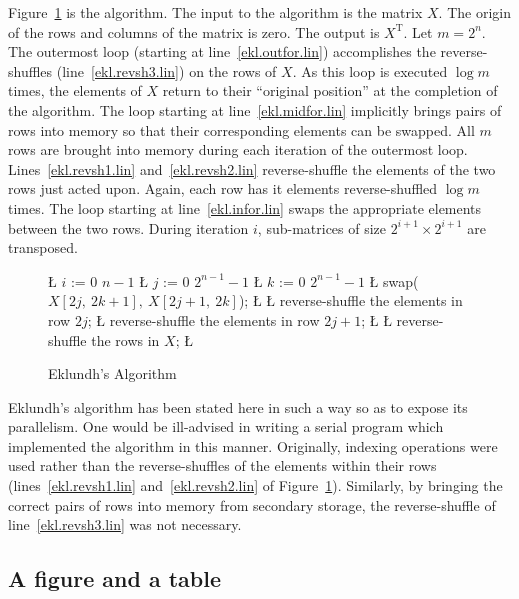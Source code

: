 Figure~\ref{eklalg.fig} is the algorithm.  The input to the
algorithm is the matrix $X$\@.  The origin of the rows and columns of the
matrix is zero.  The output is $X^{\mathrm T}$.  Let $m = 2^n$.  The outermost
loop (starting at line~\ref{ekl.outfor.lin}) accomplishes the
reverse-shuffles (line~\ref{ekl.revsh3.lin}) on
the rows of $X$\@.  As this loop is executed $\log m$ times, the elements
of $X$ return to their ``original position'' at the completion of the
algorithm.  The loop starting at line~\ref{ekl.midfor.lin} implicitly
brings pairs of
rows into memory so that their corresponding elements can be swapped.  All
$m$ rows are brought into memory during each iteration of the outermost
loop.  Lines~\ref{ekl.revsh1.lin} and~\ref{ekl.revsh2.lin} reverse-shuffle
the elements of the two rows
just acted upon.  Again, each row has it elements reverse-shuffled $\log m$
times.  The loop starting at line~\ref{ekl.infor.lin} swaps the appropriate
elements
between the two rows.  During iteration $i$, sub-matrices of size $2^{i+1}
\times 2^{i+1}$ are transposed.

\begin{figure}
\centering
\begin{pseudocode}
\L{ $i$ := 0  $n-1$ \label{ekl.outfor.lin}}
\L{    $j$ := 0  $2^{n-1}-1$ \label{ekl.midfor.lin}}
\L{       $k$ := 0  $2^{n-1}-1$ \label{ekl.infor.lin}}
\L{         swap($X[2j,\ 2k+1],\ X[2j+1,\ 2k]$);}
\L{      \noline}
\L{      reverse-shuffle the elements in row $2j$;\label{ekl.revsh1.lin}}
\L{      reverse-shuffle the elements in row $2j+1$;\label{ekl.revsh2.lin}}
\L{   \noline}
\L{   reverse-shuffle the rows in $X$;\label{ekl.revsh3.lin}}
\L{\noline}
\end{pseudocode}
\caption{Eklundh's Algorithm}
\label{eklalg.fig}
\end{figure}

Eklundh's algorithm has been stated here in such a way so as to expose its
parallelism.  One would be ill-advised in writing a serial program which
implemented the algorithm in this manner.  Originally, indexing operations
were used rather than the reverse-shuffles of the elements within their
rows (lines~\ref{ekl.revsh1.lin} and~\ref{ekl.revsh2.lin} of
Figure~\ref{eklalg.fig}).  Similarly, by bringing the correct pairs of rows
into memory from secondary storage, the reverse-shuffle of
line~\ref{ekl.revsh3.lin} was not necessary.

\subsection{A figure and a table}

